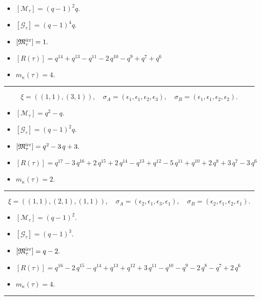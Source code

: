 \documentclass[10pt,a4paper]{amsart}
\begin{document}
\begin{itemize}
 \item $[\mathcal{M}_{\tau}] = {\left(q - 1\right)}^{2} q .$

 \item $[\mathcal{G}_{\tau}] = {\left(q - 1\right)}^{4} q .$

 \item $[{\frak M}_{\tau}^{\textrm{irr}}] = 1 .$

 \item $[R(\tau)] = q^{14} + q^{13} - q^{11} - 2 \, q^{10} - q^{9} + q^{7} + q^{6} $

 \item $m_{\kappa}(\tau) = 4 .$

 \end{itemize}
\noindent\rule{8cm}{0.4pt}

$$\xi = ({(1, 1)}, {(3, 1)}),\quad \sigma_A = ({{\epsilon_1}}, {{\epsilon_1, \epsilon_2, \epsilon_3}}),\quad \sigma_B = ({{\epsilon_1}}, {{\epsilon_1, \epsilon_2, \epsilon_2}}).$$

\begin{itemize}
 \item $[\mathcal{M}_{\tau}] = q^{2} - q .$

 \item $[\mathcal{G}_{\tau}] = {\left(q - 1\right)}^{2} q .$

 \item $[{\frak M}_{\tau}^{\textrm{irr}}] = q^{2} - 3 \, q + 3 .$

 \item $[R(\tau)] = q^{17} - 3 \, q^{16} + 2 \, q^{15} + 2 \, q^{14} - q^{13} + q^{12} - 5 \, q^{11} + q^{10} + 2 \, q^{8} + 3 \, q^{7} - 3 \, q^{6} $

 \item $m_{\kappa}(\tau) = 2 .$

 \end{itemize}
\noindent\rule{8cm}{0.4pt}

$$\xi = ({(1, 1)}, {(2, 1), (1, 1)}),\quad \sigma_A = ({{\epsilon_2}}, {{\epsilon_1, \epsilon_3}, {\epsilon_1}}),\quad \sigma_B = ({{\epsilon_2}}, {{\epsilon_1, \epsilon_2}, {\epsilon_1}}).$$

\begin{itemize}
 \item $[\mathcal{M}_{\tau}] = {\left(q - 1\right)}^{2} .$

 \item $[\mathcal{G}_{\tau}] = {\left(q - 1\right)}^{3} .$

 \item $[{\frak M}_{\tau}^{\textrm{irr}}] = q - 2 .$

 \item $[R(\tau)] = q^{16} - 2 \, q^{15} - q^{14} + q^{13} + q^{12} + 3 \, q^{11} - q^{10} - q^{9} - 2 \, q^{8} - q^{7} + 2 \, q^{6} $

 \item $m_{\kappa}(\tau) = 4 .$

 \end{itemize}
\noindent\rule{8cm}{0.4pt}
\end{document}
